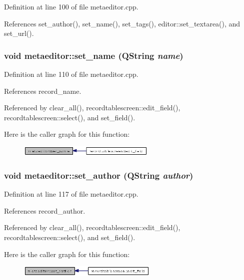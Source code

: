 Definition at line 100 of file metaeditor.cpp.

References set\_\-author(), set\_\-name(), set\_\-tags(), editor::set\_\-textarea(), and set\_\-url().
\subsubsection{\setlength{\rightskip}{0pt plus 5cm}void metaeditor::set\_\-name (QString {\em name})}\label{classmetaeditor_209a7a5bd42af050a9fb55c6c8948ce4}




Definition at line 110 of file metaeditor.cpp.

References record\_\-name.

Referenced by clear\_\-all(), recordtablescreen::edit\_\-field(), recordtablescreen::select(), and set\_\-field().

Here is the caller graph for this function:\begin{figure}[H]
\begin{center}
\leavevmode
\includegraphics[width=185pt]{classmetaeditor_209a7a5bd42af050a9fb55c6c8948ce4_icgraph}
\end{center}
\end{figure}
\subsubsection{\setlength{\rightskip}{0pt plus 5cm}void metaeditor::set\_\-author (QString {\em author})}\label{classmetaeditor_4703d66561c6c4e45d356a107b435124}




Definition at line 117 of file metaeditor.cpp.

References record\_\-author.

Referenced by clear\_\-all(), recordtablescreen::edit\_\-field(), recordtablescreen::select(), and set\_\-field().

Here is the caller graph for this function:\begin{figure}[H]
\begin{center}
\leavevmode
\includegraphics[width=188pt]{classmetaeditor_4703d66561c6c4e45d356a107b435124_icgraph}
\end{center}
\end{figure}
